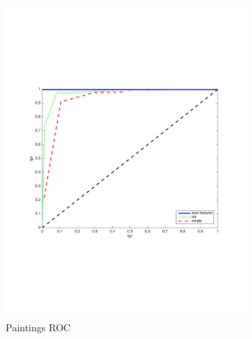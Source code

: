 \documentclass[english,12pt,a4paper,pdftex,elec,utf8, table]{aaltothesis}
\begin{document}
\begin{figure}[htb]
  \begin{center}
  \begin{subfigure}[b]{0.49\textwidth}
    \includegraphics[width=\textwidth]{figures/Shave10pxROC.pdf}
    \caption{Paintings ROC}
    \label{Shaveroc}
  \end{subfigure}
  \begin{subfigure}[b]{0.49\textwidth}

\end{subfigure}
\end{center}
\end{figure}
\end{document}
